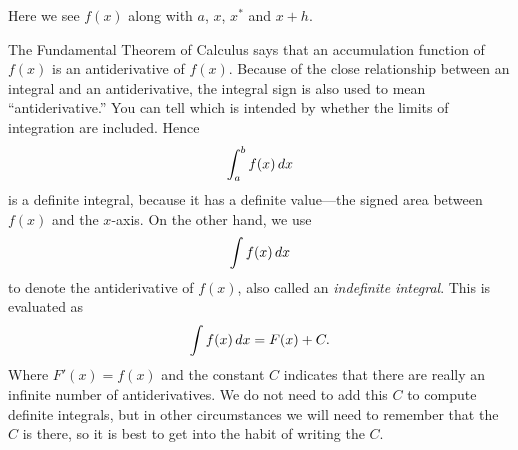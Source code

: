 \documentclass{ximera}
\begin{document}
\begin{marginfigure}[-6in]
\caption{Here we see $f(x)$ along with $a$, $x$, $x^*$ and $x+h$.}
\label{F:fun diagram}
\end{marginfigure}


The Fundamental Theorem of Calculus says that an accumulation function
of $f(x)$ is an antiderivative of $f(x)$.  Because of the close
relationship between an integral and an antiderivative, the integral
sign is also used to mean ``antiderivative.'' You can tell which is
intended by whether the limits of integration are included. Hence
\[
  \int_a^b f(x)\,d x
\] 
is a definite integral, because it has a definite value---the signed
area between $f(x)$ and the $x$-axis.  On the other hand, we use
\[
  \int f(x)\,d x
\]
to denote the antiderivative of $f(x)$, also called an
\textit{indefinite integral}.
This is evaluated as
\[
  \int f(x)\,d x = F(x)+C.
\]
Where $F'(x) = f(x)$ and the constant $C$ indicates that there are
really an infinite number of antiderivatives. We do not need to add
this $C$ to compute definite integrals, but in other circumstances we
will need to remember that the $C$ is there, so it is best to get into
the habit of writing the $C$.
\end{document}
